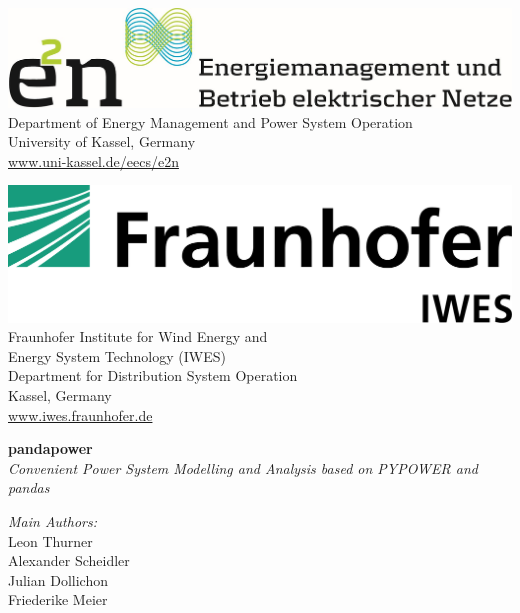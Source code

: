 \begin{titlepage}
\vspace*{1cm} 

\center
\begin{minipage}[t]{0.45\textwidth}
\includegraphics[width=1\textwidth]{../report/e2n.jpg}\\[1.5em]
Department of Energy Management and Power System Operation \\[0.5em]
University of Kassel, Germany \\[0.5em]
\href{url}{www.uni-kassel.de/eecs/e2n}
\end{minipage}\hfill
\begin{minipage}[t]{0.45\textwidth}
\includegraphics[width=.75\textwidth]{../report/IWES.png} \\[1em]
Fraunhofer Institute for Wind Energy and \\ Energy System Technology (IWES) \\[0.5em]
Department for Distribution System Operation \\[0.5em]
Kassel, Germany \\[0.5em]
\href{url}{www.iwes.fraunhofer.de}
\end{minipage}



\vfill
\large
\flushleft
\begin{minipage}{0.5\textwidth}
\textbf{pandapower}\\[0.5em]
\textit{Convenient Power System Modelling and Analysis based on PYPOWER and pandas}\\[2em]
\end{minipage}

\textit{Main Authors:}\\
Leon Thurner \\
Alexander Scheidler\\
Julian Dollichon\\
Friederike Meier\\[1em]


\end{titlepage}
